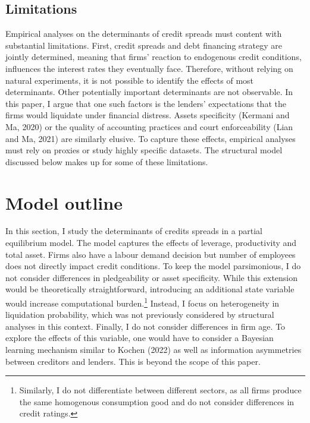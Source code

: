 \documentclass[12pt]{article}
\begin{document}
\subsection{Limitations}
Empirical analyses on the determinants of credit spreads must content with substantial limitations. First, credit spreads and debt financing strategy are jointly determined, meaning that firms' reaction to endogenous credit conditions, influences the interest rates they eventually face. Therefore, without relying on natural experiments, it is not possible to identify the effects of most determinants. Other potentially important determinants are not observable. In this paper, I argue that one such factors is the lenders' expectations that the firms would liquidate under financial distress. Assets specificity (Kermani and Ma, 2020) or the quality of accounting practices and court enforceability (Lian and Ma, 2021) are similarly elusive. To capture these effects, empirical analyses must rely on proxies or study highly specific datasets. The structural model discussed below makes up for some of these limitations. 

\section{Model outline} \label{sec:model}

In this section, I study the determinants of credits spreads in a partial equilibrium model. The model captures the effects of leverage, productivity and total asset. Firms also have a labour demand decision but number of employees does not directly impact credit conditions. To keep the model parsimonious, I do not consider differences in pledgeability or asset specificity. While this extension would be theoretically straightforward, introducing an additional state variable would increase computational burden.\footnote{Similarly, I do not differentiate between different sectors, as all firms produce the same homogenous consumption good and do not consider differences in credit ratings.} Instead, I focus on heterogeneity in liquidation probability, which was not previously considered by structural analyses in this context. Finally, I do not consider differences in firm age. To explore the effects of this variable, one would have to consider a Bayesian learning mechanism similar to Kochen (2022) as well as information asymmetries between creditors and lenders. This is beyond the scope of this paper.
\end{document}
